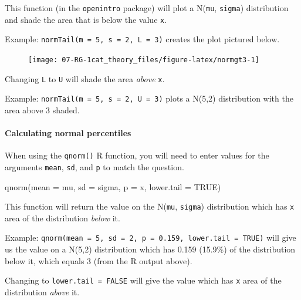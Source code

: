 \documentclass[
]{report}
\newenvironment{Shaded}{\begin{snugshade}}{\end{snugshade}}
\newcommand{\AttributeTok}[1]{\textcolor[rgb]{0.77,0.63,0.00}{#1}}
\newcommand{\ConstantTok}[1]{\textcolor[rgb]{0.00,0.00,0.00}{#1}}
\newcommand{\FunctionTok}[1]{\textcolor[rgb]{0.00,0.00,0.00}{#1}}
\newcommand{\NormalTok}[1]{#1}
\begin{document}
This function (in the \texttt{openintro} package) will plot a N(\texttt{mu}, \texttt{sigma}) distribution and shade the area that is below the value \texttt{x}.

Example: \texttt{normTail(m\ =\ 5,\ s\ =\ 2,\ L\ =\ 3)} creates the plot pictured below.

\begin{figure}

{\centering \texttt{[image: 07-RG-1cat\_theory\_files/figure-latex/normgt3-1]} 

}

\end{figure}

Changing \texttt{L} to \texttt{U} will shade the area \emph{above} \texttt{x}.

Example: \texttt{normTail(m\ =\ 5,\ s\ =\ 2,\ U\ =\ 3)} plots a N(5,2) distribution with the area above 3 shaded.

\hypertarget{calculating-normal-percentiles}{%
\paragraph*{Calculating normal percentiles}\label{calculating-normal-percentiles}}

When using the \texttt{qnorm()} R function, you will need to enter values for the arguments \texttt{mean}, \texttt{sd}, and \texttt{p} to match the question.

\begin{Shaded}
\begin{Highlighting}[]
\FunctionTok{qnorm}\NormalTok{(}\AttributeTok{mean =}\NormalTok{ mu, }\AttributeTok{sd =}\NormalTok{ sigma, }\AttributeTok{p =}\NormalTok{ x, }\AttributeTok{lower.tail =} \ConstantTok{TRUE}\NormalTok{)}
\end{Highlighting}
\end{Shaded}

This function will return the value on the N(\texttt{mu}, \texttt{sigma}) distribution which has \texttt{x} area of the distribution \emph{below} it.

Example: \texttt{qnorm(mean\ =\ 5,\ sd\ =\ 2,\ p\ =\ 0.159,\ lower.tail\ =\ TRUE)} will give us the value on a N(5,2) distribution which has 0.159 (15.9\%) of the distribution below it, which equals 3 (from the R output above).

Changing to \texttt{lower.tail\ =\ FALSE} will give the value which has \texttt{x} area of the distribution \emph{above} it.
\end{document}
